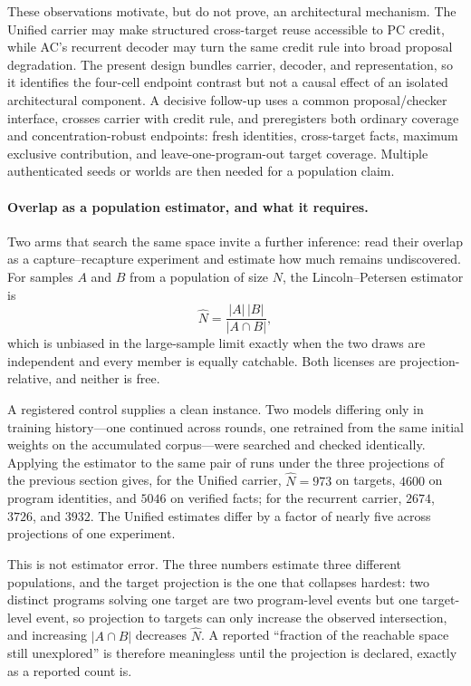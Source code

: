 \documentclass[11pt,openany]{report}
\begin{document}
These observations motivate, but do not prove, an architectural mechanism.
The Unified carrier may make structured cross-target reuse accessible to PC
credit, while AC's recurrent decoder may turn the same credit rule into broad
proposal degradation.  The present design bundles carrier, decoder, and
representation, so it identifies the four-cell endpoint contrast but not a
causal effect of an isolated architectural component.  A decisive follow-up
uses a common proposal/checker interface, crosses carrier with credit rule,
and preregisters both ordinary coverage and concentration-robust endpoints:
fresh identities, cross-target facts, maximum exclusive contribution, and
leave-one-program-out target coverage.  Multiple authenticated seeds or
worlds are then needed for a population claim.

\paragraph{Overlap as a population estimator, and what it requires.}
Two arms that search the same space invite a further inference: read their
overlap as a capture--recapture experiment and estimate how much remains
undiscovered.  For samples $A$ and $B$ from a population of size $N$, the
Lincoln--Petersen estimator is
\[
 \hat N = \frac{|A|\,|B|}{|A\cap B|},
\]
which is unbiased in the large-sample limit exactly when the two draws are
independent and every member is equally catchable.  Both licenses are
projection-relative, and neither is free.

A registered control supplies a clean instance.  Two models differing only in
training history---one continued across rounds, one retrained from the same
initial weights on the accumulated corpus---were searched and checked
identically.  Applying the estimator to the same pair of runs under the three
projections of the previous section gives, for the Unified carrier,
$\hat N=973$ on targets, $4600$ on program identities, and $5046$ on verified
facts; for the recurrent carrier, $2674$, $3726$, and $3932$.  The Unified
estimates differ by a factor of nearly five across projections of one
experiment.

This is not estimator error.  The three numbers estimate three different
populations, and the target projection is the one that collapses hardest: two
distinct programs solving one target are two program-level events but one
target-level event, so projection to targets can only increase the observed
intersection, and increasing $|A\cap B|$ decreases $\hat N$.  A reported
``fraction of the reachable space still unexplored'' is therefore meaningless
until the projection is declared, exactly as a reported count is.
\end{document}
